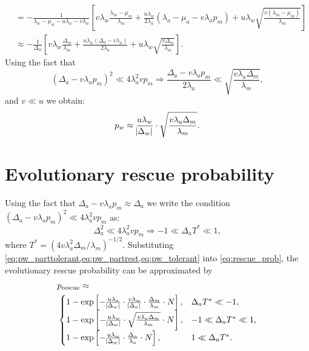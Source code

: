 \documentclass[12pt]{extarticle}
\newcommand{\presc}{p_\text{rescue}}
\begin{document}
\begin{appendices}
\begin{equation}
\begin{aligned}
&=-\frac{1}{\lambda_w-\mu_w-u\lambda_w-v\lambda_w}\left[v\lambda_w\frac{\lambda_m-\mu_m}{\lambda_m}+\frac{u\lambda_w}{2\lambda_a}\left(\lambda_a-\mu_a-v\lambda_ap_m\right)+u\lambda_w\sqrt{\frac{v\left(\lambda_m-\mu_m\right)}{\lambda_m}}\right]\\
&\approx-\frac{1}{\Delta_w}\left[v\lambda_w\frac{\Delta_m}{\lambda_m}+\frac{u\lambda_w\left(\Delta_a-v\lambda_a\right)}{2\lambda_a}+u\lambda_w\sqrt{\frac{v\Delta_m}{\lambda_m}}\right].
\end{aligned}
\end{equation}
Using the fact that
\begin{equation*}
\left(\Delta_a-v\lambda_ap_m\right)^2 \ll 4\lambda_a^2vp_m\Rightarrow\frac{\Delta_a-v\lambda_ap_m}{2\lambda_a} \ll \sqrt{\frac{v\lambda_a\Delta_m}{\lambda_m}},
\end{equation*}
and $v\ll u$ we obtain:
\begin{equation}\label{eq:pw_partrest}
p_w\approx\frac{u\lambda_w}{\abs{\Delta_w}}\cdot\sqrt{\frac{v\lambda_a\Delta_m}{\lambda_m}}.
\end{equation}

\section{Evolutionary rescue probability}\label{sec:appendix-rescue-prob}
Using the fact that $\Delta_a-v\lambda_ap_m\approx\Delta_a$ we write the condition $\left(\Delta_a-v\lambda_ap_m\right)^2 \ll 4\lambda_a^2vp_m$ as:
\begin{equation*}
\Delta_a^2 \ll 4\lambda_a^2vp_m\Rightarrow -1\ll\Delta_aT^*\ll1,
\end{equation*}
where $T^* = (4 v \lambda_a^2 \Delta_m/\lambda_m)^{-1/2}$.
Substituting \cref{eq:pw_parttolerant,eq:pw_partrest,eq:pw_tolerant} into \cref{eq:rescue_prob}, the evolutionary rescue probability can be approximated by
\begin{equation}\label{rescue_prob_approx}
\begin{aligned}
&\presc \approx \\
  &\begin{cases}
   1-\exp\left[-\frac{u\lambda_a}{\abs{\Delta_w}}\cdot\frac{v\lambda_w}{\abs{\Delta_a}}\cdot\frac{\Delta_m}{\lambda_m}\cdot N\right] ,&
   \Delta_aT^*\ll-1 ,\\
   1-\exp\left[-\frac{u\lambda_w}{\abs{\Delta_w}}\cdot\sqrt{\frac{v\lambda_a\Delta_m}{\lambda_m}}\cdot N\right] ,&
  -1\ll\Delta_aT^*\ll1 ,\\
   1-\exp\left[-\frac{u\lambda_w}{\abs{\Delta_w}} \cdot \frac{\Delta_a}{\lambda_a}\cdot N\right] ,&
   1\ll\Delta_aT^*.
  \end{cases}
\end{aligned}
\end{equation}


\end{appendices}
\end{document}
